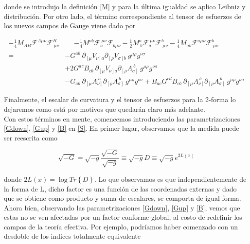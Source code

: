\documentclass{article}
\numberwithin{equation}{section}
\begin{document}
donde se introdujo la definición \ref{M} y para la última igualdad se aplico Leibniz y distribución. Por otro lado, el término correspondiente al tensor de esfuerzos de los nuevos campos de Gauge viene dado por

\begin{equation}\label{MFF}
\begin{aligned}
-\frac{1}{4} M_{A B} \mathcal{F}^{A \mu \nu} \mathcal{F}^B_{\ \mu \nu} &= -\frac{1}{4} M^{a b} \mathcal{F}_a^{\ \mu \nu} \mathcal{F}_{b \mu \nu} -\frac{1}{2} M^a_{\ b} \mathcal{F}_a^{\ \mu \nu} \mathcal{F}^b_{\ \mu \nu} -\frac{1}{4} M_{a b} \mathcal{F}^{a \mu \nu} \mathcal{F}^b_{\ \mu \nu}\\
=& - G^{a b} \ \partial_{\left[\mu\right.} V_{\left.\nu\right] a} \partial_{\left[\rho\right.} V_{\left.\sigma\right] b} \ g^{\mu \rho} g^{\nu \sigma}\\
&+ 2 G^{a c} B_{c b} \ \partial_{\left[\mu\right.} V_{\left.\nu\right] a} \partial_{\left[\rho\right.} A_{\left.\sigma\right]}^{\ b} \ g^{\mu \rho} g^{\nu \sigma}\\
&- G_{a b} \ \partial_{\left[\mu\right.} A_{\left.\nu\right]}^{\ a} \partial_{\left[\rho\right.} A_{\left.\sigma\right]}^{\ b} \ g^{\mu \rho} g^{\nu \sigma} + B_{a c} G^{c d} B_{c b} \ \partial_{\left[\mu\right.} A_{\left.\nu\right]}^{\ b} \partial_{\left[\rho\right.} A_{\left.\sigma\right]}^{\ b} \ g^{\mu \rho} g^{\nu \sigma}
\end{aligned}
\end{equation}

Finalmente, el escalar de curvatura y el tensor de esfuerzos para la 2-forma lo dejaremos como está por motivos que quedarán claro más adelante.\\

Con estos términos en mente, comencemos introduciendo las parametrizaciones \ref{Gdown}, \ref{Gup} y \ref{B} en \ref{S}. En primer lugar, observamos que la medida puede ser reescrita como

\begin{equation}
\sqrt{-G} = \sqrt{-g} \frac{\sqrt{-G}}{\sqrt{-g}} \equiv \sqrt{-g} D \equiv \sqrt{-g} e^{2 L(x)}
\end{equation}

donde $ 2 L(x)= \log Tr\left\{ D\right\}  $. Lo que observamos es que independientemente de la forma de L, dicho factor es una función de las coordenadas externas y dado que se obtiene como producto y suma de escalares, se comporta de igual forma. Ahora bien, observando las parametrizaciones \ref{Gdown}, \ref{Gup} y \ref{B}, vemos que estas no se ven afectadas por un factor conforme global, al costo de redefinir los campos de la teoría efectiva. Por ejemplo, podríamos haber comenzado con un desdoble de los indices totalmente equivalente
\end{document}
